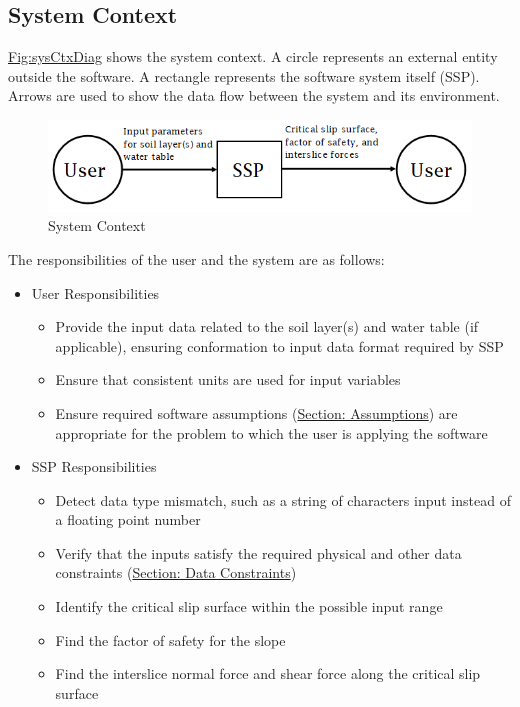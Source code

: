 \documentclass[12pt]{article}
\begin{document}
\subsection{System Context}
\label{Sec:SysContext}
\hyperref[Figure:sysCtxDiag]{Fig:sysCtxDiag} shows the system context. A circle represents an external entity outside the software. A rectangle represents the software system itself (SSP). Arrows are used to show the data flow between the system and its environment.
\begin{figure}
\begin{center}
\includegraphics[width=\textwidth]{../../../datafiles/SSP/SystemContextFigure.png}
\caption{System Context}
\label{Figure:sysCtxDiag}
\end{center}
\end{figure}
The responsibilities of the user and the system are as follows:
\begin{itemize}
\item{User Responsibilities}
\begin{itemize}
\item{Provide the input data related to the soil layer(s) and water table (if applicable), ensuring conformation to input data format required by SSP}
\item{Ensure that consistent units are used for input variables}
\item{Ensure required software assumptions (\hyperref[Sec:Assumps]{Section: Assumptions}) are appropriate for the problem to which the user is applying the software}
\end{itemize}
\item{SSP Responsibilities}
\begin{itemize}
\item{Detect data type mismatch, such as a string of characters input instead of a floating point number}
\item{Verify that the inputs satisfy the required physical and other data constraints (\hyperref[Sec:DataConstraints]{Section: Data Constraints})}
\item{Identify the critical slip surface within the possible input range}
\item{Find the factor of safety for the slope}
\item{Find the interslice normal force and shear force along the critical slip surface}
\end{itemize}
\end{itemize}
\end{document}
